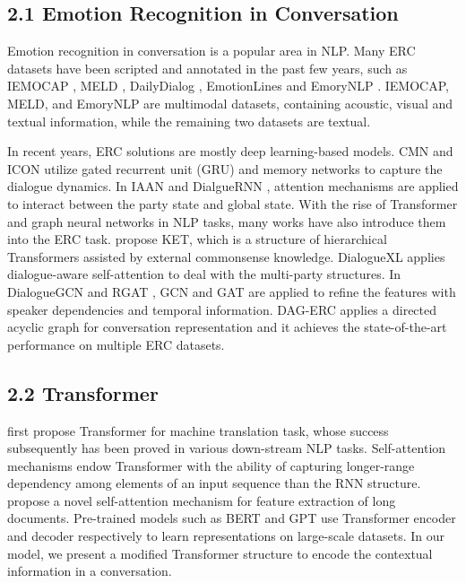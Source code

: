 \documentclass[letterpaper]{article} \usepackage{aaai22}  \usepackage{times}  \usepackage{helvet}  \usepackage{courier}  \usepackage[hyphens]{url}  \usepackage{graphicx} \urlstyle{rm} \def\UrlFont{\rm}  \usepackage{natbib}  \usepackage{caption} \DeclareCaptionStyle{ruled}{labelfont=normalfont,labelsep=colon,strut=off} \frenchspacing  \setlength{\pdfpagewidth}{8.5in}  \setlength{\pdfpageheight}{11in}  \usepackage{algorithm}
\begin{document}
\subsection{2.1 Emotion Recognition in Conversation} 
Emotion recognition in conversation is a popular area in NLP. Many ERC datasets have been scripted and annotated in the past few years, such as IEMOCAP \cite{iemocap}, MELD \cite{meld}, DailyDialog \cite{dailydialog}, EmotionLines \cite{emotionlines} and EmoryNLP \cite{emorynlp}. IEMOCAP, MELD, and EmoryNLP are multimodal datasets, containing acoustic, visual and textual information, while the remaining two datasets are textual.

In recent years, ERC solutions are mostly deep learning-based models. CMN \cite{cmn} and ICON \cite{icon} utilize gated recurrent unit (GRU) and memory networks to capture the dialogue dynamics. In IAAN \cite{iaan} and DialgueRNN \cite{dialoguernn}, attention mechanisms are applied to interact between the party state and global state. With the rise of Transformer and graph neural networks in NLP tasks, many works have also introduce them into the ERC task. \citet{ket} propose KET, which is a structure of hierarchical Transformers assisted by external commonsense knowledge. DialogueXL \cite{dialogxl} applies dialogue-aware self-attention to deal with the multi-party structures. In DialogueGCN \cite{dialoguegcn} and RGAT \cite{rgat}, GCN \cite{kipf} and GAT \cite{gat} are applied to refine the features with speaker dependencies and temporal information. DAG-ERC \cite{dag} applies a directed acyclic graph for conversation representation and it achieves the state-of-the-art performance on multiple ERC datasets.


\subsection{2.2 Transformer} 
\citet{transformer} first propose Transformer for machine translation task, whose success subsequently has been proved in various down-stream NLP tasks. Self-attention mechanisms endow Transformer with the ability of capturing longer-range dependency among elements of an input sequence than the RNN structure.
\citet{longformer} propose a novel self-attention mechanism for feature extraction of long documents.
Pre-trained models such as BERT \cite{bert} and GPT \cite{gpt} use Transformer encoder and decoder respectively to learn representations on large-scale datasets. 
In our model, we present a modified Transformer structure to encode the contextual information in a conversation.
\end{document}

